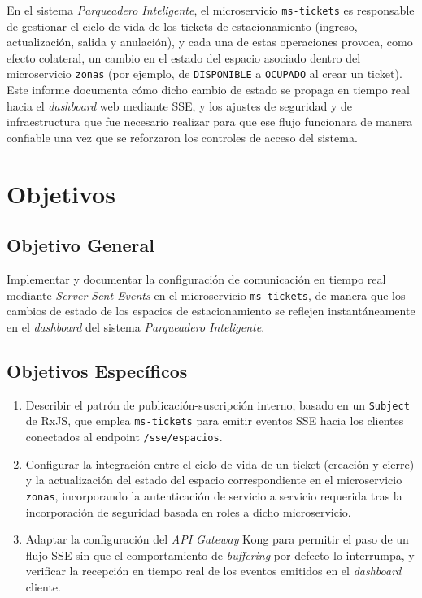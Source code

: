 \documentclass[12pt,letterpaper]{article}
\begin{document}
En el sistema \emph{Parqueadero Inteligente}, el microservicio \texttt{ms-tickets} es responsable de gestionar el ciclo de vida de los tickets de estacionamiento (ingreso, actualización, salida y anulación), y cada una de estas operaciones provoca, como efecto colateral, un cambio en el estado del espacio asociado dentro del microservicio \texttt{zonas} (por ejemplo, de \texttt{DISPONIBLE} a \texttt{OCUPADO} al crear un ticket). Este informe documenta cómo dicho cambio de estado se propaga en tiempo real hacia el \emph{dashboard} web mediante SSE, y los ajustes de seguridad y de infraestructura que fue necesario realizar para que ese flujo funcionara de manera confiable una vez que se reforzaron los controles de acceso del sistema.

\section{Objetivos}

\subsection*{Objetivo General}

Implementar y documentar la configuración de comunicación en tiempo real mediante \emph{Server-Sent Events} en el microservicio \texttt{ms-tickets}, de manera que los cambios de estado de los espacios de estacionamiento se reflejen instantáneamente en el \emph{dashboard} del sistema \emph{Parqueadero Inteligente}.

\subsection*{Objetivos Específicos}

\begin{enumerate}[label=\arabic*.]
  \item Describir el patrón de publicación-suscripción interno, basado en un \texttt{Subject} de RxJS, que emplea \texttt{ms-tickets} para emitir eventos SSE hacia los clientes conectados al endpoint \texttt{/sse/espacios}.
  \item Configurar la integración entre el ciclo de vida de un ticket (creación y cierre) y la actualización del estado del espacio correspondiente en el microservicio \texttt{zonas}, incorporando la autenticación de servicio a servicio requerida tras la incorporación de seguridad basada en roles a dicho microservicio.
  \item Adaptar la configuración del \emph{API Gateway} Kong para permitir el paso de un flujo SSE sin que el comportamiento de \emph{buffering} por defecto lo interrumpa, y verificar la recepción en tiempo real de los eventos emitidos en el \emph{dashboard} cliente.
\end{enumerate}
\end{document}
